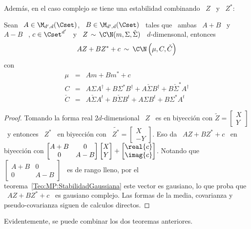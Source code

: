 Adem\'as, en el  caso complejo se tiene  una estabilidad combinando \ $Z$  \ y \
$Z^*$:
%
\begin{teorema}%
\label{Teo:MP:StabilidadGaussianaComplejaZZestrella}
%
Sean \ $A \in \M_{d',d}(\Cset)$, \  $B \in \M_{d',d}(\Cset)$ \ tales que \ ambas
\ $A+B$ \ y \  $A-B$ \ \SZ{sean de rango lleno}, $c \in \Cset^{d'}$  \ y \ $Z \,
\sim \, \C\N(m,\Sigma,\check{\Sigma})$ \ $d$-dimensonal, entonces
  \[
  A Z + B Z^* + c \: \sim \: \C\N\left( \mu , C , \check{C}  \right)
  \]
  con
  \[
  \begin{array}{lll}
  \mu & = & A m + B m^* + c\\[2.5mm]
  C & = & A \Sigma A^\dag + B \Sigma^* B^\dag + A \check{\Sigma} B^\dag + B
  \check{\Sigma}^* A^\dag\\[2.5mm]
  \check{C} & = & A \check{\Sigma} A^t + B \check{\Sigma} B^t + A \Sigma B^t + B
  \Sigma^* A^t
  \end{array}
  \]
\end{teorema}
\begin{proof}
  Tomando  la  forma  real  $2d$-dimensional  \  $Z$ \  es  en  biyecci\'on  con
  $\widetilde{Z} = \begin{bmatrix} X\\ Y \end{bmatrix}$ \ y entonces \ $Z^*$ \ en
  biyecci\'on con \ $\widetilde{Z^*} = \begin{bmatrix} X\\-Y \end{bmatrix}$. Eso
  da \ $A  Z + B Z^*  + c$ \ en biyecci\'on  con $\begin{bmatrix} A+B &  0\\ 0 &
    A-B  \end{bmatrix}  \begin{bmatrix}  X\\ Y  \end{bmatrix}  +  \begin{bmatrix}
    \real{c}\\ \imag{c} \end{bmatrix}$. Notando que \ $\begin{bmatrix} A+B & 0\\
    0    &   A-B    \end{bmatrix}$   \    es    de   rango    lleno,   por    el
  teorema~\ref{Teo:MP:StabilidadGaussiana} este vector es gausiano, lo que proba
  que \  $A Z  + B  Z^* + c$  \ es  gausiano complejo. Las  formas de  la media,
  covarianza y pseudo-covarianza siguen de calculos directos.
\end{proof}
%
Evidentemente, se puede combinar los dos teoremas anteriores.

